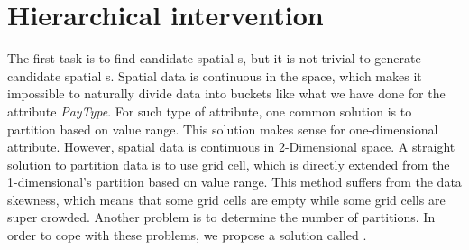 \section{Hierarchical intervention}
\label{sec:hei_intervention}

The first task is to find candidate spatial {\explanation}s, but
it is not trivial to generate candidate spatial {\explanation}s. 
Spatial data is continuous in the space, which makes it impossible to naturally divide data into buckets like what we have done for the attribute \emph{PayType}. 
For such type of attribute, one common solution is to partition based on value range. 
This solution makes sense for one-dimensional attribute. 
However, spatial data is continuous in 2-Dimensional space. 
A straight solution to partition data is to use grid cell, which is directly extended from the 1-dimensional's partition based on value range. 
This method suffers from the data skewness, which means that some grid cells are empty while some grid cells are super crowded. 
Another problem is to determine the number of partitions. 
In order to cope with these problems, we propose a solution called {\solution}. 




